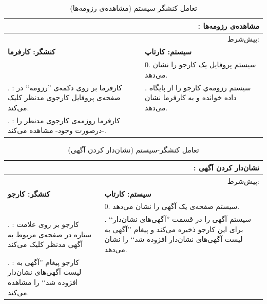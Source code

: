 \documentclass[12pt,svgnames,oneside]{book}
\newcommand{\say}[1]{‍''{#1}`‍`}
\newcommand{\uc}[1]{\lr{UC{#1}}}
\newcommand{\tucbw}{\lr{TUCBW}}
\newcommand{\tucew}{\lr{TUCEW}}
\newcommand{\actorsystem}[1]{
\textbf{کنشگر: {#1}} &
\textbf{سیستم: کارتاپ} \\
}
\newcommand{\zerostep}[1]{
& 0. {#1} \\
}
\newcounter{UseCaseCounter}
\newcommand{\step}[1]{
\stepcounter{UseCaseCounter}\arabic{UseCaseCounter}. {#1}
}
\newcommand{\ucname}[2]{
\multicolumn{2}{|r|}{\uc{{#1}}: {#2}} \\
}
\newcommand{\preif}[1]{
\multicolumn{2}{|r|}{پیش‌شرط:‌ {#1}} \\
}
\begin{document}
\setcounter{UseCaseCounter}{0}
\begin{table}[H]
\caption{تعامل کنشگر-سیستم  (مشاهده‌ی رزومه‌ها)}
\label{table:uc:see-resumes}
\begin{center}
\begin{tabular}{|p{}|p{}|}
\hline

\ucname{25}{مشاهده‌ی رزومه‌ها}
\hline

\preif{}
\hline

\actorsystem{کارفرما}
\hline

\zerostep{{\small سیستم پروفایل یک کارجو را نشان می‌دهد.}}
\hline

\step{\textbf{\tucbw}: کارفرما بر روی دکمه‌ی \say{رزومه} در صفحه‌ی پروفایل کارجوی مدنظر کلیک می‌کند.} & 
\step{{\small سیستم رزومه‌ي کارجو را از پایگاه داده خوانده و به کارفرما نشان می‌دهد.}} \\
\hline

\step{{\small \textbf{\tucew}: کارفرما روزمه‌ی کارجوی مدنطر را -درصورت وجود- مشاهده‌ می‌کند.}} & 
\\
\hline

\end{tabular}
\end{center}
\end{table}

\setcounter{UseCaseCounter}{0}
\begin{table}[H]
\caption{تعامل کنشگر-سیستم  (نشان‌دار‌ کردن آگهی)}
\label{table:uc:bookmark}
\begin{center}
\begin{tabular}{|p{}|p{}|}
\hline

\ucname{17}{نشان‌دار‌ کردن آگهی}
\hline

\preif{}
\hline

\actorsystem{کارجو}
\hline

\zerostep{{\small سیستم صفحه‌ی یک آگهی را نشان می‌دهد.}}
\hline

\step{{\small \textbf{\tucbw}: کارجو بر روی علامت ستاره در صفحه‌ی مربوط به آگهی مدنظر کلیک می‌کند}} & 
\step{{\small ‌سیستم آگهی را در قسمت \say{آگهی‌های نشان‌دار} برای این کارجو ذخیره می‌کند و پیغام \say{آگهی به لیست آگهی‌های نشان‌دار افزوده شد} را نشان می‌دهد.}} \\
\hline

\step{{\small \textbf{\tucew}: کارجو پیغام \say{آگهی به لیست آگهی‌های نشان‌دار افزوده شد} را مشاهده می‌کند.}} & 
\\
\hline

\end{tabular}
\end{center}
\end{table}
\end{document}
